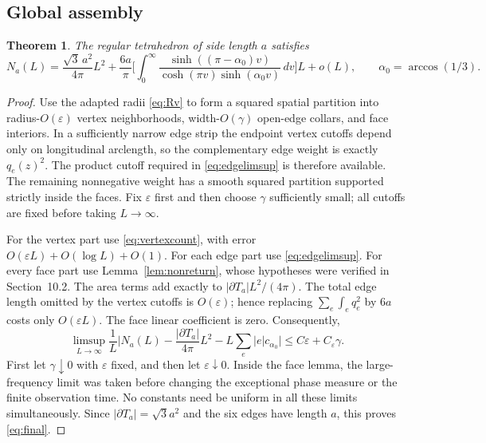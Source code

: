 \documentclass[11pt]{amsart}
\numberwithin{equation}{section}
\newtheorem{theorem}{Theorem}[section]
\theoremstyle{remark}
\begin{document}
\subsection{Global assembly}
\begin{theorem}\label{thm:sharp}
The regular tetrahedron of side length $a$ satisfies
\begin{equation}\label{eq:final}
N_a(L)=\frac{\sqrt3\,a^2}{4\pi}L^2+\frac{6a}{\pi}\Big[\int_0^\infty\frac{\sinh((\pi-\alpha_0)v)}{\cosh(\pi v)\sinh(\alpha_0v)}\,dv\Big]L+o(L),\qquad \alpha_0=\arccos(1/3) .
\end{equation}
\end{theorem}

\begin{proof}
Use the adapted radii \eqref{eq:Rv} to form a squared spatial partition into radius-$O(\varepsilon)$ vertex neighborhoods, width-$O(\gamma)$ open-edge collars, and face interiors. In a sufficiently narrow edge strip the endpoint vertex cutoffs depend only on longitudinal arclength, so the complementary edge weight is exactly $q_e(z)^2$. The product cutoff required in \eqref{eq:edgelimsup} is therefore available. The remaining nonnegative weight has a smooth squared partition supported strictly inside the faces. Fix $\varepsilon$ first and then choose $\gamma$ sufficiently small; all cutoffs are fixed before taking $L\to\infty$.

For the vertex part use \eqref{eq:vertexcount}, with error $O(\varepsilon L)+O(\log L)+O(1)$. For each edge part use \eqref{eq:edgelimsup}. For every face part use Lemma~\ref{lem:nonreturn}, whose hypotheses were verified in Section~10.2. The area terms add exactly to $|\partial T_a|L^2/(4\pi)$. The total edge length omitted by the vertex cutoffs is $O(\varepsilon)$; hence replacing $\sum_e\int_eq_e^2$ by $6a$ costs only $O(\varepsilon L)$. The face linear coefficient is zero. Consequently,
\begin{equation}\label{eq:globallimsup}
\limsup_{L\to\infty}\frac1L\Big|N_a(L)-\frac{|\partial T_a|}{4\pi}L^2-L\sum_e|e|c_{\alpha_0}\Big|\le C\varepsilon+C_\varepsilon\gamma .
\end{equation}
First let $\gamma\downarrow0$ with $\varepsilon$ fixed, and then let $\varepsilon\downarrow0$. Inside the face lemma, the large-frequency limit was taken before changing the exceptional phase measure or the finite observation time. No constants need be uniform in all these limits simultaneously. Since $|\partial T_a|=\sqrt3a^2$ and the six edges have length $a$, this proves \eqref{eq:final}.
\end{proof}
\end{document}

